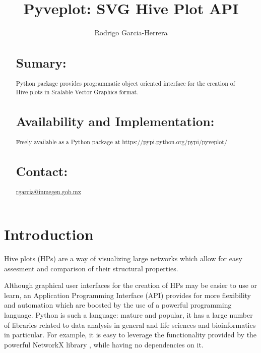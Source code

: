 \documentclass{bioinfo}
\begin{document}

\title[short Title]{Pyveplot: SVG Hive Plot API}
\author[]{Rodrigo Garcia-Herrera}
\address{Department of Bioinformatics, National Institute of Genomic
  Medicine, Periferico Sur 4809, Mexico City 14610}



\maketitle

\begin{abstract}

\section{Sumary:}
Python package provides programmatic object oriented interface for the
creation of Hive plots in Scalable Vector Graphics format.
\section{Availability and Implementation:}
Freely available as a Python package at
https://pypi.python.org/pypi/pyveplot/

\section{Contact:} \href{rgarcia@inmegen.gob.mx}{rgarcia@inmegen.gob.mx}
\end{abstract}

\section{Introduction}

Hive plots (HPs) are a way of visualizing large networks which allow
for easy assesment and comparison of their structural properties.
\cite{krzywinski2012hive}

Although graphical user interfaces for the creation of HPs may be
easier to use or learn, an Application Programming Interface (API)
provides for more flexibility and automation which are boosted by the
use of a powerful programming language. Python is such a language:
mature and popular, it has a large number of libraries related to data
analysis in general and life sciences and bioinformatics in
particular. For example, it is easy to leverage the functionality
provided by the powerful NetworkX
library \cite{hagberg-2008-exploring}, while having no dependencies on
it.
\end{document}
